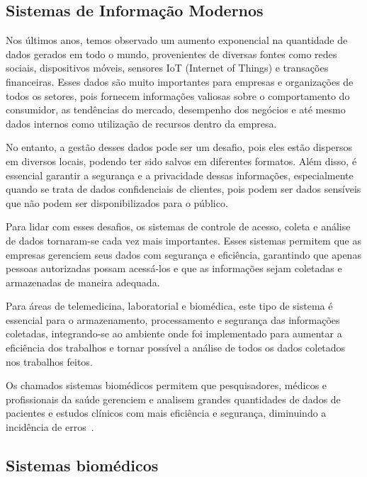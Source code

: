 \subsection{Sistemas de Informação Modernos}


Nos últimos anos, temos observado um aumento exponencial na quantidade de dados gerados em todo o mundo, provenientes de diversas fontes como redes sociais, dispositivos móveis, sensores IoT (Internet of Things) e transações financeiras.
Esses dados são muito importantes para empresas e organizações de todos os setores, pois fornecem informações valiosas sobre o comportamento do consumidor, as tendências do mercado, desempenho dos negócios e até mesmo dados internos como utilização de recursos dentro da empresa.

No entanto, a gestão desses dados pode ser um desafio, pois eles estão dispersos em diversos locais, podendo ter sido salvos em diferentes formatos. Além disso, é essencial garantir a segurança e a privacidade dessas informações, especialmente quando se trata de dados confidenciais de clientes, pois podem ser dados sensíveis que não podem ser disponibilizados para o público.

Para lidar com esses desafios, os sistemas de controle de acesso, coleta e análise de dados tornaram-se cada vez mais importantes. Esses sistemas permitem que as empresas gerenciem seus dados com segurança e eficiência, garantindo que apenas pessoas autorizadas possam acessá-los e que as informações sejam coletadas e armazenadas de maneira adequada.

Para áreas de telemedicina, laboratorial e biomédica, este tipo de sistema é essencial para o armazenamento, processamento e segurança das informações coletadas, integrando-se ao ambiente onde foi implementado para aumentar a eficiência dos trabalhos e tornar possível a análise de todos os dados coletados nos trabalhos feitos.

Os chamados sistemas biomédicos permitem que pesquisadores, médicos e profissionais da saúde gerenciem e analisem grandes quantidades de dados de pacientes e estudos clínicos com mais eficiência e segurança, diminuindo a incidência de erros~\cite{Sun2021LaboratoryEfficiency}.

\subsection{Sistemas biomédicos}

